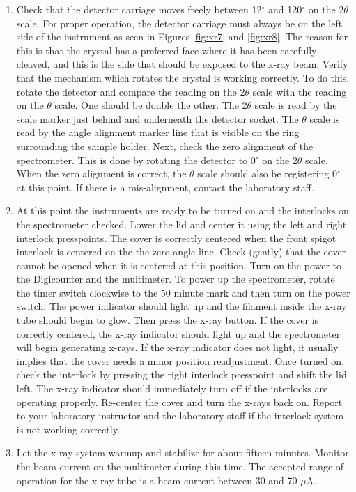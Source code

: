 \begin{enumerate}
\item Check that the detector carriage moves freely between 12$^{\circ}$ and 120$^{\circ}$ on the 2$\theta$ scale. For proper operation, the detector carriage must always be on the left side of the instrument as seen in Figures \ref{fig:xr7} and \ref{fig:xr8}. The reason for this is that the crystal has a preferred face where it has been carefully cleaved, and this is the side that should be exposed to the x-ray beam. Verify that the mechanism which rotates the crystal is working correctly. To do this, rotate the detector and compare the reading on the 2$\theta$ scale with the reading on the $\theta$ scale. One should be double the other. The 2$\theta$ scale is read by the scale marker just behind and underneath the detector socket. The $\theta$ scale is read by the angle alignment marker line that is visible on the ring surrounding the sample holder. Next, check the zero alignment of the spectrometer. This is done by rotating the detector to 0$^{\circ}$ on the 2$\theta$ scale. When the zero alignment is correct, the $\theta$ scale should also be registering 0$^{\circ}$ at this point. If there is a mis-alignment, contact the laboratory staff.

\item At this point the instruments are ready to be turned on and the interlocks on the spectrometer checked. Lower the lid and center it using the left and right interlock presspoints. The cover is correctly centered when the front spigot interlock is centered on the the zero angle line. Check (gently) that the cover cannot be opened when it is centered at this position. Turn on the power to the Digicounter and the multimeter. To power up the spectrometer, rotate the timer switch clockwise to the 50 minute mark and then turn on the power switch. The power indicator should light up and the filament inside the x-ray tube should begin to glow. Then press the x-ray button. If the cover is correctly centered, the x-ray indicator should light up and the spectrometer will begin generating x-rays. If the x-ray indicator does not light, it usually implies that the cover needs a minor position readjustment. Once turned on, check the interlock by pressing the right interlock presspoint and shift the lid left. The x-ray indicator should immediately turn off if the interlocks are operating properly. Re-center the cover and turn the x-rays back on. Report to your laboratory instructor and the laboratory staff if the interlock system is not working correctly.

\item Let the x-ray system warmup and stabilize for about fifteen minutes. Monitor the beam current on the multimeter during this time. The accepted range of operation for the x-ray tube is a beam current between 30 and 70 $\mu$A.


\end{enumerate}
